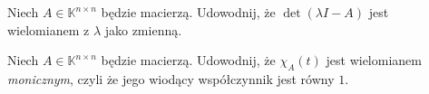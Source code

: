 
\begin{exercise}\label{ex:characteristic-eq-is-poly}
	Niech $A \in \mathbb{K}^{n \times n}$ będzie macierzą.
	Udowodnij,
		że $\det(\lambda I - A)$ jest wielomianem z $\lambda$ jako zmienną.
\end{exercise}

\begin{exercise}
	Niech $A \in \mathbb{K}^{n \times n}$ będzie macierzą.
	Udowodnij,
		że $\chi_A(t)$ jest wielomianem \textit{monicznym},
		czyli że jego wiodący współczynnik jest równy $1$.
\end{exercise}
